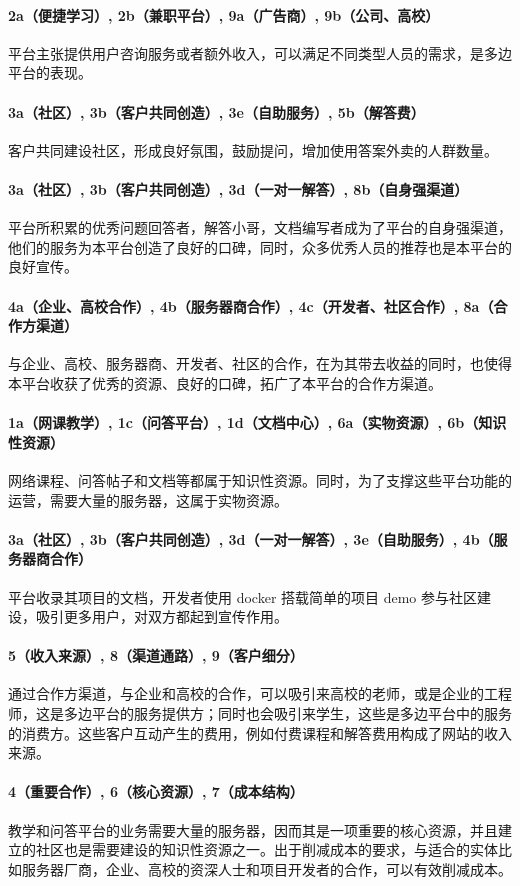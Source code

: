 \documentclass[a4paper]{ctexart}
\begin{document}
\paragraph{2a（便捷学习）, 2b（兼职平台）, 9a（广告商）, 9b（公司、高校）}平台主张提供用户咨询服务或者额外收入，可以满足不同类型人员的需求，是多边平台的表现。
\paragraph{3a（社区）, 3b（客户共同创造）, 3e（自助服务）, 5b（解答费）}客户共同建设社区，形成良好氛围，鼓励提问，增加使用答案外卖的人群数量。
\paragraph{3a（社区）, 3b（客户共同创造）, 3d（一对一解答）, 8b（自身强渠道）}平台所积累的优秀问题回答者，解答小哥，文档编写者成为了平台的自身强渠道，他们的服务为本平台创造了良好的口碑，同时，众多优秀人员的推荐也是本平台的良好宣传。
\paragraph{4a（企业、高校合作）, 4b（服务器商合作）, 4c（开发者、社区合作）, 8a（合作方渠道）}与企业、高校、服务器商、开发者、社区的合作，在为其带去收益的同时，也使得本平台收获了优秀的资源、良好的口碑，拓广了本平台的合作方渠道。
\paragraph{1a（网课教学）, 1c（问答平台）, 1d（文档中心）, 6a（实物资源）, 6b（知识性资源）}网络课程、问答帖子和文档等都属于知识性资源。同时，为了支撑这些平台功能的运营，需要大量的服务器，这属于实物资源。
\paragraph{3a（社区）, 3b（客户共同创造）, 3d（一对一解答）, 3e（自助服务）, 4b（服务器商合作）}平台收录其项目的文档，开发者使用 docker 搭载简单的项目 demo 参与社区建设，吸引更多用户，对双方都起到宣传作用。
\paragraph{5（收入来源）, 8（渠道通路）, 9（客户细分）}通过合作方渠道，与企业和高校的合作，可以吸引来高校的老师，或是企业的工程师，这是多边平台的服务提供方；同时也会吸引来学生，这些是多边平台中的服务的消费方。这些客户互动产生的费用，例如付费课程和解答费用构成了网站的收入来源。
\paragraph{4（重要合作）, 6（核心资源）, 7（成本结构）}教学和问答平台的业务需要大量的服务器，因而其是一项重要的核心资源，并且建立的社区也是需要建设的知识性资源之一。出于削减成本的要求，与适合的实体比如服务器厂商，企业、高校的资深人士和项目开发者的合作，可以有效削减成本。
\end{document}
